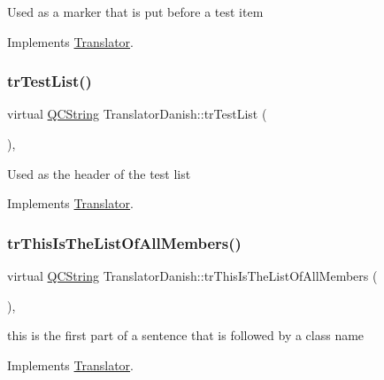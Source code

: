 Used as a marker that is put before a test item 

Implements \mbox{\hyperlink{class_translator}{Translator}}.

\mbox{\label{class_translator_danish_a9ec3d7448d274bc46d1be1509c1edfb5}} 
\subsubsection{\texorpdfstring{trTestList()}{trTestList()}}
{\footnotesize\ttfamily virtual \mbox{\hyperlink{class_q_c_string}{Q\+C\+String}} Translator\+Danish\+::tr\+Test\+List (\begin{DoxyParamCaption}{ }\end{DoxyParamCaption})\hspace{0.3cm}{\ttfamily [inline]}, {\ttfamily [virtual]}}

Used as the header of the test list 

Implements \mbox{\hyperlink{class_translator}{Translator}}.

\mbox{\label{class_translator_danish_abc402e9cc655fabde18b1d7426ce6264}} 
\subsubsection{\texorpdfstring{trThisIsTheListOfAllMembers()}{trThisIsTheListOfAllMembers()}}
{\footnotesize\ttfamily virtual \mbox{\hyperlink{class_q_c_string}{Q\+C\+String}} Translator\+Danish\+::tr\+This\+Is\+The\+List\+Of\+All\+Members (\begin{DoxyParamCaption}{ }\end{DoxyParamCaption})\hspace{0.3cm}{\ttfamily [inline]}, {\ttfamily [virtual]}}

this is the first part of a sentence that is followed by a class name 

Implements \mbox{\hyperlink{class_translator}{Translator}}.

\mbox{\label{class_translator_danish_ab6eb817b9d388b6cc72a5411d550b7ad}} 
